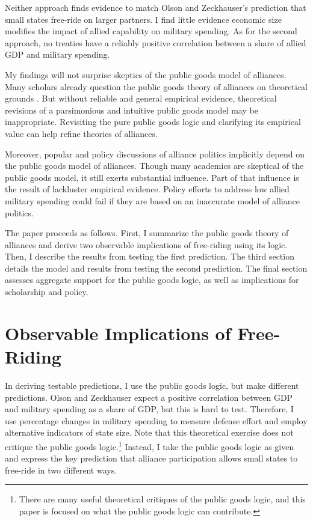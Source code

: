 \documentclass[12pt]{article}
\begin{document}
Neither approach finds evidence to match Olson and Zeckhauser's prediction that small states free-ride on larger partners. 
I find little evidence economic size modifies the impact of allied capability on military spending.
As for the second approach, no treaties have a reliably positive correlation between a share of allied GDP and military spending. 


My findings will not surprise skeptics of the public goods model of alliances. 
Many scholars already question the public goods theory of alliances on theoretical grounds \citep{Palmer1990, SandlerHartley2001, Norrlof2010}. 
But without reliable and general empirical evidence, theoretical revisions of a parsimonious and intuitive public goods model may be inappropriate.
Revisiting the pure public goods logic and clarifying its empirical value can help refine theories of alliances. 


Moreover, popular and policy discussions of alliance politics implicitly depend on the public goods model of alliances. 
Though many academics are skeptical of the public goods model, it still exerts substantial influence. 
Part of that influence is the result of lackluster empirical evidence. 
Policy efforts to address low allied military spending could fail if they are based on an inaccurate model of alliance politics. 


The paper proceeds as follows.
First, I summarize the public goods theory of alliances and derive two observable implications of free-riding using its logic.
Then, I describe the results from testing the first prediction.
The third section details the model and results from testing the second prediction. 
The final section assesses aggregate support for the public goods logic, as well as implications for scholarship and policy. 



\section{Observable Implications of Free-Riding}

In deriving testable predictions, I use the public goods logic, but make different predictions.
Olson and Zeckhauser expect a positive correlation between GDP and military spending as a share of GDP, but this is hard to test. 
Therefore, I use percentage changes in military spending to measure defense effort and employ alternative indicators of state size. 
Note that this theoretical exercise does not critique the public goods logic.\footnote{There are many useful theoretical critiques of the public goods logic, and this paper is focused on what the public goods logic can contribute.} 
Instead, I take the public goods logic as given and express the key prediction that alliance participation allows small states to free-ride in two different ways. 
\end{document}
